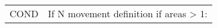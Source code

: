 \begin{center}
\begin{longtable}{p{0.5cm} p{2cm} p{12cm}}



		\multicolumn{2}{l}{COND} & \multicolumn{1}{l}{If N movement definition if areas > 1:}\\
		




\end{longtable}
\end{center}
